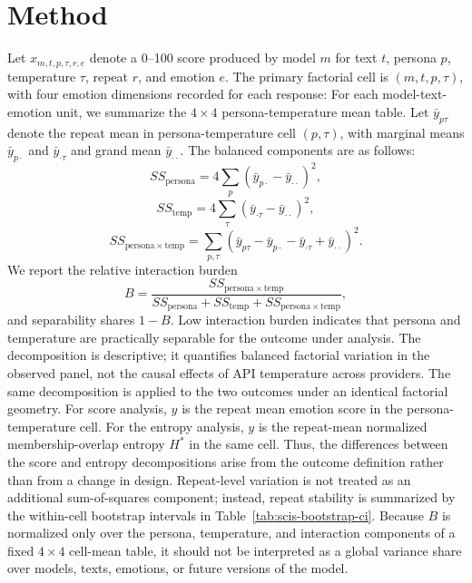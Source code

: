 \documentclass[conference]{IEEEtran}
\begin{document}
\section{Method}
Let $x_{m,t,p,\tau,r,e}$ denote a 0--100 score produced by model $m$ for text $t$, persona $p$, temperature $\tau$, repeat $r$, and emotion $e$.
The primary factorial cell is $(m,t,p,\tau)$, with four emotion dimensions recorded for each response:
For each model-text-emotion unit, we summarize the $4 \times 4$ persona-temperature mean table.
Let $\bar{y}_{p\tau}$ denote the repeat mean in persona-temperature cell $(p,\tau)$, with marginal means $\bar{y}_{p\cdot}$ and $\bar{y}_{\cdot\tau}$ and grand mean $\bar{y}_{\cdot\cdot}$.
The balanced components are as follows:
\begin{equation}
SS_{\mathrm{persona}} =
4\sum_p(\bar{y}_{p\cdot}-\bar{y}_{\cdot\cdot})^2,
\end{equation}
\begin{equation}
SS_{\mathrm{temp}} =
4\sum_\tau(\bar{y}_{\cdot\tau}-\bar{y}_{\cdot\cdot})^2,
\end{equation}
\begin{equation}
SS_{\mathrm{persona}\times\mathrm{temp}} =
\sum_{p,\tau}
(\bar{y}_{p\tau}-\bar{y}_{p\cdot}-\bar{y}_{\cdot\tau}
+\bar{y}_{\cdot\cdot})^2.
\end{equation}
We report the relative interaction burden
\begin{equation}
B =
\frac{SS_{\mathrm{persona}\times\mathrm{temp}}}
{SS_{\mathrm{persona}} + SS_{\mathrm{temp}} +
SS_{\mathrm{persona}\times\mathrm{temp}}},
\end{equation}
and separability shares $1-B$.
Low interaction burden indicates that persona and temperature are practically separable for the outcome under analysis.
The decomposition is descriptive; it quantifies balanced factorial variation in the observed panel, not the causal effects of API temperature across providers.
The same decomposition is applied to the two outcomes under an identical factorial geometry.
For score analysis, $y$ is the repeat mean emotion score in the persona-temperature cell.
For the entropy analysis, $y$ is the repeat-mean normalized membership-overlap entropy $H^*$ in the same cell.
Thus, the differences between the score and entropy decompositions arise from the outcome definition rather than from a change in design.
Repeat-level variation is not treated as an additional sum-of-squares component; instead, repeat stability is summarized by the within-cell bootstrap intervals in Table~\ref{tab:scis-bootstrap-ci}.
Because $B$ is normalized only over the persona, temperature, and interaction components of a fixed $4\times4$ cell-mean table, it should not be interpreted as a global variance share over models, texts, emotions, or future versions of the model.
\end{document}
